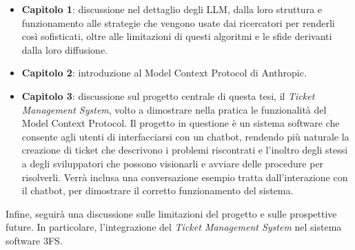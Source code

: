 \begin{itemize}
    \item \textbf{Capitolo 1}: discussione nel dettaglio degli LLM, dalla loro struttura e funzionamento alle strategie che vengono
    usate dai ricercatori per renderli così sofisticati, oltre alle limitazioni di questi algoritmi e le sfide derivanti dalla loro diffusione.
    \item \textbf{Capitolo 2}: introduzione al Model Context Protocol di Anthropic.
    \item \textbf{Capitolo 3}: discussione sul progetto centrale di questa tesi, il \textit{Ticket Management System}, volto a dimostrare
    nella pratica le funzionalità del Model Context Protocol. Il progetto in questione è un sistema software che consente agli utenti di
    interfacciarsi con un chatbot, rendendo più naturale la creazione di ticket che descrivono i problemi riscontrati e l'inoltro degli stessi
    a degli sviluppatori che possono visionarli e avviare delle procedure per risolverli. Verrà inclusa una conversazione esempio tratta
    dall'interazione con il chatbot, per dimostrare il corretto funzionamento del sistema.
\end{itemize}
Infine, seguirà una discussione sulle limitazioni del progetto e sulle prospettive future. In particolare, l'integrazione del
\textit{Ticket Management System} nel sistema software 3FS{\textsuperscript{\tiny\textcopyright}}.